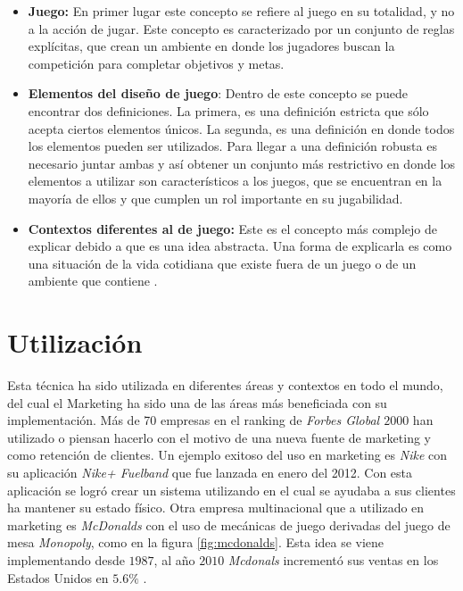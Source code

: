 \begin{itemize}
    \item {\bf Juego:}
        En primer lugar este concepto se refiere al juego en su totalidad,
        y no a la acción de jugar.
        Este concepto es caracterizado por un conjunto de reglas explícitas,
        que crean un ambiente en donde los jugadores buscan la competición para
        completar objetivos y metas.

    \item {\bf Elementos del diseño de juego}:
        Dentro de este concepto se puede encontrar dos definiciones.
        La primera, es una definición estricta que sólo acepta ciertos elementos
        únicos.
        La segunda, es una definición en donde todos los elementos pueden ser
        utilizados.
        Para llegar a una definición robusta es necesario juntar ambas y así
        obtener un conjunto más restrictivo en donde los elementos a utilizar
        son característicos a los juegos, que se encuentran en la mayoría de ellos
        y que cumplen un rol importante en su jugabilidad.

    \item {\bf Contextos diferentes al de juego:}
        Este es el concepto más complejo de explicar debido a que es una idea
        abstracta.
        Una forma de explicarla es como una situación de la vida cotidiana
        que existe fuera de un juego o de un ambiente que contiene {\gam}.

\end{itemize}

\section{Utilización}

Esta técnica ha sido utilizada en diferentes áreas y contextos en todo el mundo,
del cual el Marketing ha sido una de las áreas más beneficiada con su
implementación.
Más de 70 empresas en el ranking de \emph{Forbes Global $2000$} han utilizado o
piensan hacerlo con el motivo de una nueva fuente de marketing y como retención
de clientes\cite{Gam:Util:1}.
Un ejemplo exitoso del uso en marketing es \emph{Nike} con su aplicación
\emph{Nike+ Fuelband} que fue lanzada en enero del 2012\cite{Gam:Util:2}.
Con esta aplicación se logró crear un sistema utilizando {\gam} en el cual se ayudaba
a sus clientes ha mantener su estado físico.
Otra empresa multinacional que a utilizado {\gam} en marketing es \emph{McDonalds}
con el uso de mecánicas de juego derivadas del juego de mesa \emph{Monopoly}, como
en la figura \ref{fig:mcdonalds}.
Esta idea se viene implementando desde $1987$, al año $2010$
\emph{Mcdonals} incrementó sus ventas en los Estados Unidos en $5.6\%$
\cite{Gam:Util:2}.

